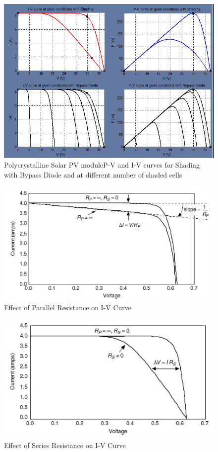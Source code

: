 \documentclass[12pt]{article}
\begin{document}
\begin{figure}[H]
\centering
\includegraphics[scale=0.5]{Poly_Shading_With_ByPassDiode}
\caption{Polycrystalline Solar PV moduleP-V and I-V curves for Shading with Bypass Diode and at different number of shaded cells}
\label{figc3h24} %
\end{figure}


\begin{figure}[H]
\centering
\includegraphics[scale=0.5]{pv1}
\caption{Effect of Parallel Resistance on I-V Curve}
\label{figc3h111} %
\end{figure}

\begin{figure}[H]
\centering
\includegraphics[scale=0.5]{pv2}
\caption{Effect of Series Resistance on I-V Curve}
\label{figc3h222} %
\end{figure}
\end{document}
